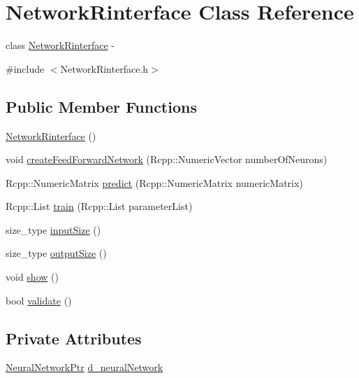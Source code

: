 \hypertarget{class_network_rinterface}{
\section{NetworkRinterface Class Reference}
\label{class_network_rinterface}
}


class \hyperlink{class_network_rinterface}{NetworkRinterface} -\/  




{\ttfamily \#include $<$NetworkRinterface.h$>$}

\subsection*{Public Member Functions}
\begin{DoxyCompactItemize}
\item 
\hyperlink{class_network_rinterface_afcfa99fcf4ce5b5a0a3a18a0b7fd1b9c}{NetworkRinterface} ()
\item 
void \hyperlink{class_network_rinterface_aa2a5e2b5605382da022dd0f277f0a73f}{createFeedForwardNetwork} (Rcpp::NumericVector numberOfNeurons)
\item 
Rcpp::NumericMatrix \hyperlink{class_network_rinterface_a28c63ea70e49d8771e8242107b65d62c}{predict} (Rcpp::NumericMatrix numericMatrix)
\item 
Rcpp::List \hyperlink{class_network_rinterface_adf8323eeb7133fdc9adf37a7755a05df}{train} (Rcpp::List parameterList)
\item 
size\_\-type \hyperlink{class_network_rinterface_ae82e946eb0ad4fc532803ee2e34d4e08}{inputSize} ()
\item 
size\_\-type \hyperlink{class_network_rinterface_a4e5243781bd453c3abd2baea0713f7dc}{outputSize} ()
\item 
void \hyperlink{class_network_rinterface_a3bcc22e2278cc28157b807ac190c7787}{show} ()
\item 
bool \hyperlink{class_network_rinterface_a1b37bfff06e29aedd525fa25137b94e1}{validate} ()
\end{DoxyCompactItemize}
\subsection*{Private Attributes}
\begin{DoxyCompactItemize}
\item 
\hyperlink{_a_m_o_r_e_8h_a7adadf1c313313507b00cd1193db29a1}{NeuralNetworkPtr} \hyperlink{class_network_rinterface_a841abcde82202671c51525b61ce6a47d}{d\_\-neuralNetwork}
\end{DoxyCompactItemize}


